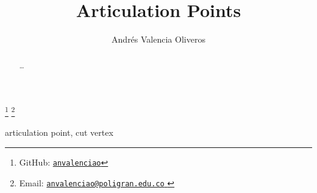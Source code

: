 \begin{frontmatter}
	\title{Articulation Points} 
	\author{Andrés Valencia Oliveros}
	\address{Facultad de Ingeniería, Diseño e Innovación\\ 
		Institución Universitaria Politécnico Grancolombiano\\
		Bogotá, Colombia
	}
	\thanks[myGitHub]{GitHub: 
		\href{https://github.com/anvalenciao/ArticulationPoints}{\texttt{anvalenciao}}
	}
	\thanks[myEmail]{Email: 
		\href{mailto:anvalenciao@poligran.edu.co}{
			\texttt{\normalshape anvalenciao@poligran.edu.co}
		}
	}

	\renewcommand{\abstractname}{\textbf{Resumen}}
	\begin{abstract}
		\dots
	\end{abstract}

	\begin{keyword}
		articulation point, cut vertex
	\end{keyword}
\end{frontmatter}
